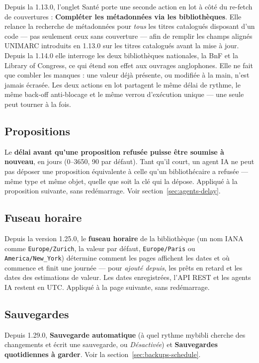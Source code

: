 Depuis la 1.13.0, l'onglet Santé porte une seconde action en lot à
côté du re-fetch de couvertures : \textbf{Compléter les métadonnées
via les bibliothèques}. Elle relance la recherche de métadonnées pour
\emph{tous} les titres catalogués disposant d'un code — pas seulement
ceux sans couverture — afin de remplir les champs alignés UNIMARC
introduits en 1.13.0 sur les titres catalogués avant la mise à jour.
Depuis la 1.14.0 elle interroge les deux bibliothèques nationales, la
BnF et la Library of Congress, ce qui étend son effet aux ouvrages
anglophones. Elle ne
fait que combler les manques : une valeur déjà présente, ou modifiée
à la main, n'est jamais écrasée. Les deux actions en lot partagent
le même délai de rythme, le même back-off anti-blocage et le même
verrou d'exécution unique — une seule peut tourner à la fois.

\subsection*{Propositions}

Le \textbf{délai avant qu'une proposition refusée puisse être soumise
à nouveau}, en jours (0--3650, 90 par défaut). Tant qu'il court, un
agent IA ne peut pas déposer une proposition équivalente à celle
qu'un bibliothécaire a refusée --- même type et même objet, quelle que
soit la clé qui la dépose. Appliqué à la proposition suivante, sans
redémarrage. Voir section~\ref{sec:agents-delay}.

\subsection*{Fuseau horaire}

Depuis la version 1.25.0, le \textbf{fuseau horaire} de la bibliothèque
(un nom IANA comme \texttt{Europe/Zurich}, la valeur par défaut,
\texttt{Europe/Paris} ou \texttt{America/New\_York}) détermine comment
les pages affichent les dates et où commence et finit une journée ---
pour \emph{ajouté depuis}, les prêts en retard et les dates des
estimations de valeur. Les dates enregistrées, l'API REST et les agents
IA restent en UTC. Appliqué à la page suivante, sans redémarrage.

\subsection*{Sauvegardes}

Depuis 1.29.0, \textbf{Sauvegarde automatique} (à quel rythme mybibli
cherche des changements et écrit une sauvegarde, ou \emph{Désactivée})
et \textbf{Sauvegardes quotidiennes à garder}. Voir la
section~\ref{sec:backups-schedule}.

